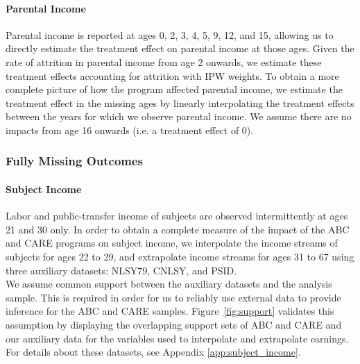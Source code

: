 \paragraph{Parental Income}

\noindent Parental income is reported at ages 0, 2, 3, 4, 5, 9, 12, and 15, allowing us to directly estimate
the treatment effect on parental income at those ages. Given the rate of attrition in
parental income from age 2 onwards, we estimate these treatment effects accounting for attrition
with IPW weights.
To obtain a more complete picture of how the
program affected parental income, we estimate the treatment effect in the missing ages by linearly
interpolating the treatment effects between the years for which we observe parental income. We assume
there are no impacts from age 16 onwards (i.e. a treatment effect of 0). \\


\subsubsection{Fully Missing Outcomes}
\label{app:method_noobs}

\paragraph{Subject Income}

\noindent Labor and public-transfer income of subjects are observed intermittently at ages 21 and 30 only. In order
to obtain a complete measure of the impact of the ABC and CARE programs on subject income, we interpolate
the income streams of subjects for ages 22 to 29, and extrapolate income streams for ages
31 to 67 using three auxiliary datasets: NLSY79, CNLSY, and PSID. \\

\noindent We assume common support between the auxiliary
datasets and the analysis sample. This is required in order for us to reliably use external data to provide inference for the ABC and CARE samples. Figure~\ref{fig:support} validates this
assumption by displaying the overlapping support sets of ABC and CARE and our auxiliary data for
the variables used to interpolate and extrapolate earnings. For details about these datasets, see Appendix \ref{app:subject_income}. \\


